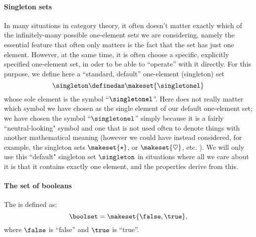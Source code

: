 \paragraph{Singleton sets}
\label{def:singleton}
In many situations in category theory, it often doesn't matter exactly which of the infinitely-many possible one-element sets we are considering, namely the essential feature that often only matters is the fact that the set has just one element. However, at the same time, it is often choose a specific, explicitly specified one-element set, in oder to be able to ``operate'' with it directly. For this purpose, we define here a ``standard, default'' one-element (singleton) set
\begin{equation}
    \singleton \definedas \makeset{\singletonel}
\end{equation}
whose sole element is the symbol ``$\singletonel$''. Here does not really matter which symbol we have chosen as the single element of our default one-element set; we have chosen the symbol ``$\singletonel$'' simply because it is a fairly ``neutral-looking" symbol and one that is not used often to denote things with another mathematical meaning (however we could have instead considered, for example, the singleton sets $\makeset{\star}$, or $\makeset{\heartsuit}$, etc. ). We will only use this ``default" singleton set $\singleton$ in situations where all we care about it is that it contains exactly one element, and the properties derive from this. 


\paragraph{The set of booleans}
\label{def:booleans}
The  is defined as:
\begin{equation}
    \boolset = \makeset{ \false, \true },
\end{equation}
where $\false$ is ``false'' and $\true$ is ``true''.
